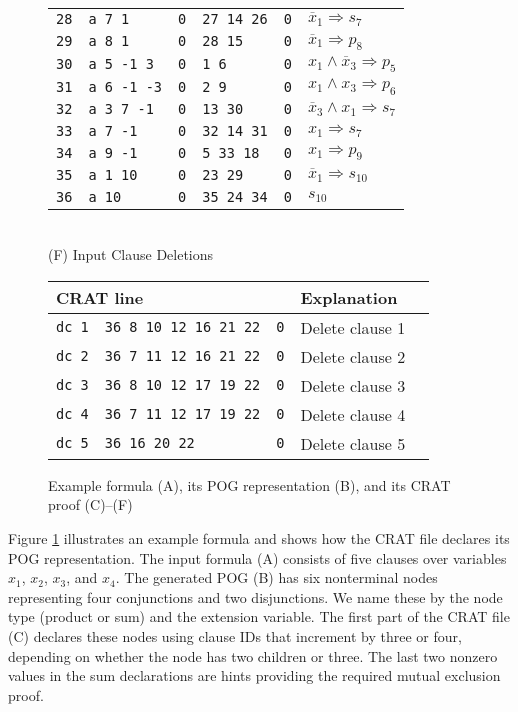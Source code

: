 \documentclass[letterpaper,USenglish,cleveref, autoref, thm-restate]{lipics-v2021}
\newcommand{\obar}[1]{\overline{#1}}
\newcommand{\imply}{\Rightarrow}
\begin{document}
\begin{figure}
\begin{minipage}{0.49\textwidth}
\begin{tabular}{llllll}
\texttt{28} & \texttt{a 7 1} & \texttt{0} & \texttt{27 14 26} & \texttt{0} & $\obar{x}_1 \imply s_7$  \\
\texttt{29} & \texttt{a 8 1} & \texttt{0} & \texttt{28 15} & \texttt{0} & $\obar{x}_1 \imply p_8$  \\
\texttt{30} & \texttt{a 5 -1 3} & \texttt{0} & \texttt{1 6} & \texttt{0} & $x_1 \land \obar{x}_3 \imply p_5$ \\
\texttt{31} & \texttt{a 6 -1 -3} & \texttt{0} & \texttt{2 9} & \texttt{0} & $x_1 \land x_3 \imply p_6$ \\
\texttt{32} & \texttt{a 3 7 -1} & \texttt{0} & \texttt{13 30} & \texttt{0} & $\obar{x}_3 \land x_1 \imply s_7$  \\
\texttt{33} & \texttt{a 7 -1} & \texttt{0} & \texttt{32 14 31} & \texttt{0} & $x_1 \imply s_7$  \\
\texttt{34} & \texttt{a 9 -1} & \texttt{0} & \texttt{5 33 18} & \texttt{0} & $x_1 \imply p_9$  \\
\texttt{35} & \texttt{a 1 10} & \texttt{0} & \texttt{23 29} & \texttt{0} & $\obar{x}_1 \imply s_{10}$  \\
\texttt{36} & \texttt{a 10} & \texttt{0} & \texttt{35 24 34} & \texttt{0} & $s_{10}$ \\
\bottomrule
\end{tabular}
\\[1.5ex]
(F) Input Clause Deletions\\[1.2ex]
\begin{tabular}{lllll}
  \toprule
 \multicolumn{3}{l}{CRAT line} & Explanation\\
\midrule
 \texttt{dc 1} & \texttt{36 8 10 12 16 21 22} & \texttt{0} & Delete clause 1 \\
 \texttt{dc 2} & \texttt{36 7 11 12 16 21 22} & \texttt{0} & Delete clause 2 \\
 \texttt{dc 3} & \texttt{36 8 10 12 17 19 22} & \texttt{0} & Delete clause 3 \\
 \texttt{dc 4} & \texttt{36 7 11 12 17 19 22} & \texttt{0} & Delete clause 4 \\
 \texttt{dc 5} & \texttt{36 16 20 22} & \texttt{0} &  Delete clause 5 \\
\bottomrule
\end{tabular}
\end{minipage}
\caption{Example formula (A), its POG representation (B), and its CRAT proof (C)--(F)}
\label{fig:eg4:all}
\end{figure}

Figure \ref{fig:eg4:all} illustrates an example formula and shows how
the CRAT file declares its POG representation.  The input formula (A)
consists of five clauses over variables $x_1$, $x_2$, $x_3$, and
$x_4$.  The generated POG (B) has six nonterminal nodes representing four
conjunctions and two disjunctions.  We name these by the node type (product or sum) and the extension variable.
The first part of the CRAT file
(C) declares these nodes using clause IDs that increment by three or
four, depending on whether the node has two children or three.
The last two nonzero values in the sum declarations are hints providing the required mutual exclusion proof.
\end{document}

